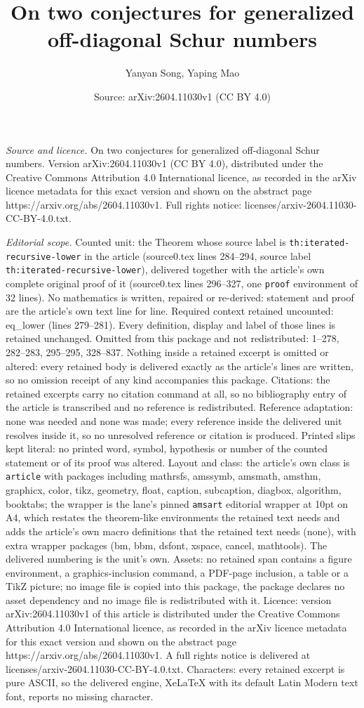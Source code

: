 \documentclass[10pt,a4paper]{amsart}
\title[On two conjectures for generalized off-diagonal Schur number]{On two conjectures for generalized off-diagonal Schur numbers}
\author{Yanyan Song, Yaping Mao}
\date{Source: arXiv:2604.11030v1 (CC BY 4.0)}
\begin{document}
\maketitle

\noindent\emph{Source and licence.} On two conjectures for generalized off-diagonal Schur numbers. Version arXiv:2604.11030v1 (CC BY 4.0), distributed under the Creative Commons Attribution 4.0 International licence, as recorded in the arXiv licence metadata for this exact version and shown on the abstract page https://arxiv.org/abs/2604.11030v1. Full rights notice: licenses/arxiv-2604.11030-CC-BY-4.0.txt.\par\smallskip

\noindent\textit{Editorial scope.} Counted unit: the Theorem whose source label is \texttt{th:iterated-recursive-lower} in the article (source0.tex lines 284--294, source label \texttt{th:iterated-recursive-lower}), delivered together with the article's own complete original proof of it (source0.tex lines 296--327, one \texttt{proof} environment of 32 lines). No mathematics is written, repaired or re-derived: statement and proof are the article's own text line for line. Required context retained uncounted: eq\_lower (lines 279--281). Every definition, display and label of those lines is retained unchanged. Omitted from this package and not redistributed: 1--278, 282--283, 295--295, 328--837. Nothing inside a retained excerpt is omitted or altered: every retained body is delivered exactly as the article's lines are written, so no omission receipt of any kind accompanies this package. Citations: the retained excerpts carry no citation command at all, so no bibliography entry of the article is transcribed and no reference is redistributed. Reference adaptation: none was needed and none was made; every reference inside the delivered unit resolves inside it, so no unresolved reference or citation is produced. Printed slips kept literal: no printed word, symbol, hypothesis or number of the counted statement or of its proof was altered. Layout and class: the article's own class is \texttt{article} with packages including mathrsfs, amssymb, amsmath, amsthm, graphicx, color, tikz, geometry, float, caption, subcaption, diagbox, algorithm, booktabs; the wrapper is the lane's pinned \texttt{amsart} editorial wrapper at 10pt on A4, which restates the theorem-like environments the retained text needs and adds the article's own macro definitions that the retained text needs (none), with extra wrapper packages (bm, bbm, dsfont, xspace, cancel, mathtools). The delivered numbering is the unit's own. Assets: no retained span contains a figure environment, a graphics-inclusion command, a PDF-page inclusion, a table or a TikZ picture; no image file is copied into this package, the package declares no asset dependency and no image file is redistributed with it. Licence: version arXiv:2604.11030v1 of this article is distributed under the Creative Commons Attribution 4.0 International licence, as recorded in the arXiv licence metadata for this exact version and shown on the abstract page https://arxiv.org/abs/2604.11030v1. A full rights notice is delivered at licenses/arxiv-2604.11030-CC-BY-4.0.txt. Characters: every retained excerpt is pure ASCII, so the delivered engine, XeLaTeX with its default Latin Modern text font, reports no missing character.
\end{document}
